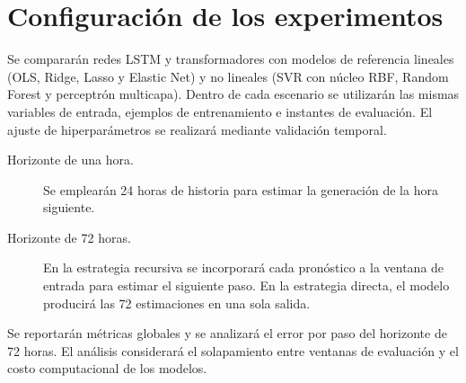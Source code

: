 \section{Configuración de los experimentos}

Se compararán redes LSTM y transformadores con modelos de referencia lineales (OLS, Ridge, Lasso y Elastic Net) y no lineales (SVR con núcleo RBF, Random Forest y perceptrón multicapa). Dentro de cada escenario se utilizarán las mismas variables de entrada, ejemplos de entrenamiento e instantes de evaluación. El ajuste de hiperparámetros se realizará mediante validación temporal.

\begin{description}
  \item[Horizonte de una hora.] Se emplearán 24 horas de historia para estimar la generación de la hora siguiente.
  \item[Horizonte de 72 horas.] En la estrategia recursiva se incorporará cada pronóstico a la ventana de entrada para estimar el siguiente paso. En la estrategia directa, el modelo producirá las 72 estimaciones en una sola salida.
\end{description}

Se reportarán métricas globales y se analizará el error por paso del horizonte de 72 horas. El análisis considerará el solapamiento entre ventanas de evaluación y el costo computacional de los modelos.
